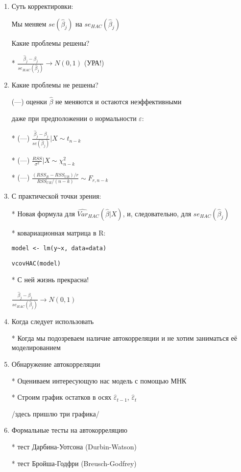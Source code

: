 \documentclass[12pt,a4paper]{article}
\begin{document}
{\begin{enumerate}
\newpage
\item  Суть корректировки:

Мы меняем $se(\hat{\beta}_j)$ на $se_{HAC}(\hat{\beta}_j)$

Какие проблемы решены?

* $\frac{\hat{\beta}_j-\beta_j}{se_{HAC}(\hat{\beta}_j)} \to N(0,1)$ (УРА!)

\item Какие проблемы не решены?

(---) оценки $\hat{\beta}$ не меняются и остаются неэффективными


даже при предположении о нормальности $\varepsilon$:

* (---) $\frac{\hat{\beta}_j-\beta_j}{se(\hat{\beta}_j)} | X \sim t_{n-k}$

* (---) $\frac{RSS}{\sigma^2} |X \sim \chi^2_{n-k}$

* (---) $\frac{(RSS_R-RSS_{UR})/r}{RSS_{UR}/(n-k)} \sim F_{r,n-k}$

\newpage
\item С практической точки зрения:

* Новая формула для $\widehat{Var}_{HAC}(\hat{\beta}|X)$, и, следовательно, для  $se_{HAC}(\hat{\beta}_j)$

* ковариационная матрица в R:

\verb|model <- lm(y~x, data=data)|

\verb|vcovHAC(model)|

* С ней жизнь прекрасна!

$\frac{\hat{\beta}_j-\beta_j}{se_{HAC}(\hat{\beta}_j)} \to N(0,1)$

\item Когда следует использовать 

* Когда мы подозреваем наличие автокорреляции и не хотим заниматься её моделированием

\newpage

\item Обнаружение автокорреляции

* Оцениваем интересующую нас модель с помощью МНК

* Строим график остатков в осях $\hat{\varepsilon}_{t-1}$, $\hat{\varepsilon}_{t}$

/здесь пришлю три графика/

\item Формальные тесты на автокорреляцию

* тест Дарбина-Уотсона (Durbin-Watson)

* тест Бройша-Годфри (Breusch-Godfrey)



\end{enumerate}}
\end{document}
